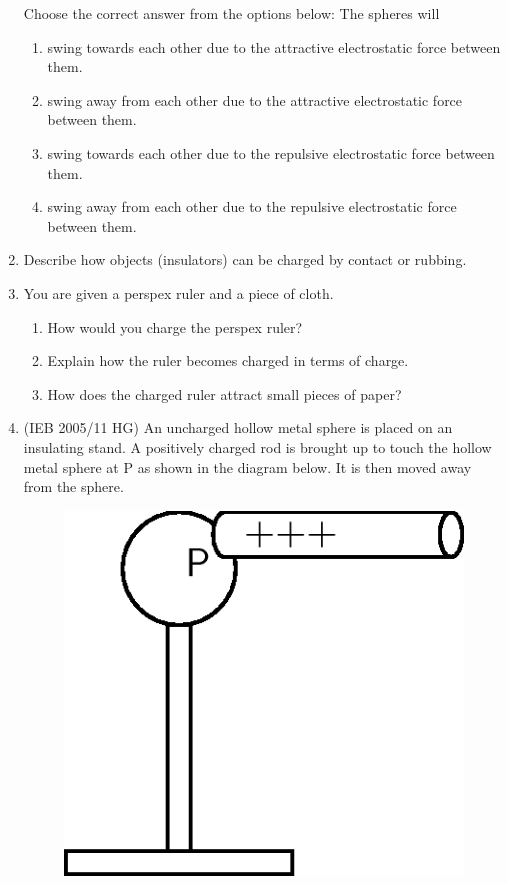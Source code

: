 \begin{enumerate}[noitemsep, label=\textbf{\arabic*}. ]
\begin{figure}[H]
\begin{center}
      \vspace{2pt}
    \vspace{.1in}
    \end{center}
 \end{figure}       
Choose the correct answer from the options below:
The spheres will
\label{m38781*id202176}\begin{enumerate}[noitemsep, label=\textbf{\alph*}. ] 
            \label{m38781*uid28}\item swing towards each other due to the attractive electrostatic force between them.
\label{m38781*uid29}\item swing away from each other due to the attractive electrostatic force between them.
\label{m38781*uid30}\item swing towards each other due to the repulsive electrostatic force between them.
\label{m38781*uid31}\item swing away from each other due to the repulsive electrostatic force between them.
\end{enumerate}
        \newline
            \label{m38781*uid32}\item Describe how objects (insulators) can be charged by contact or rubbing.\newline
\label{m38781*uid33}\item You are given a perspex ruler and a piece of cloth.
\label{m38781*id202255}\begin{enumerate}[noitemsep, label=\textbf{\alph*}. ] 
            \label{m38781*uid34}\item How would you charge the perspex ruler?
\label{m38781*uid35}\item Explain how the ruler becomes charged in terms of charge.
\label{m38781*uid36}\item How does the charged ruler attract small pieces of paper?
\end{enumerate}
        \newline
            \label{m38781*uid37}\item (IEB 2005/11 HG) An uncharged hollow metal sphere is placed on an insulating stand. A positively charged rod is brought up to touch the hollow metal sphere at P as shown in the diagram below. It is then moved away from the sphere.
    \setcounter{subfigure}{0}
	\begin{figure}[H] %
    \begin{center}
    \label{m38781*id202314!!!underscore!!!media}\label{m38781*id202314!!!underscore!!!printimage}\includegraphics[width=0.3\columnwidth]{col11305.imgs/m38781_PG10C8_013.png} %

\end{center}
\end{figure}
\end{enumerate}
